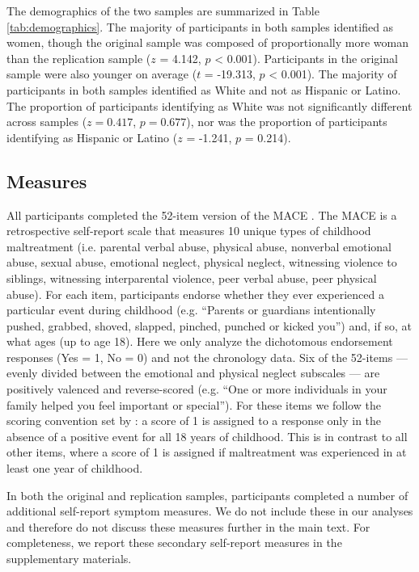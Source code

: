 \documentclass[letterpaper,man,natbib,noextraspace,floatsintext,longtable,12pt]{apa6}
\begin{document}
The demographics of the two samples are summarized in Table \ref{tab:demographics}. The majority of participants in both samples identified as women, though the original sample was composed of proportionally more woman than the replication sample ($z$ = 4.142, $p$ < 0.001). Participants in the original sample were also younger on average ($t$ = -19.313, $p$ < 0.001). The majority of participants in both samples identified as White and not as Hispanic or Latino. The proportion of participants identifying as White was not significantly different across samples ($z = 0.417$, $p = 0.677$), nor was the proportion of participants identifying as Hispanic or Latino ($z$ = -1.241, $p$ = 0.214).

\subsection{Measures}

All participants completed the 52-item version of the MACE \citep{teicher2015maltreatment}. The MACE is a retrospective self-report scale that measures 10 unique types of childhood maltreatment (i.e. parental verbal abuse, physical abuse, nonverbal emotional abuse, sexual abuse, emotional neglect, physical neglect, witnessing violence to siblings, witnessing interparental violence, peer verbal abuse, peer physical abuse). For each item, participants endorse whether they ever experienced a particular event during childhood (e.g. ``Parents or guardians intentionally pushed, grabbed, shoved, slapped, pinched, punched or kicked you'') and, if so, at what ages (up to age 18). Here we only analyze the dichotomous endorsement responses (Yes = 1, No = 0) and not the chronology data. Six of the 52-items --- evenly divided between the emotional and physical neglect subscales --- are positively valenced and reverse-scored (e.g. ``One or more individuals in your family helped you feel important or special''). For these items we follow the scoring convention set by \cite{teicher2015maltreatment}: a score of 1 is assigned to a response only in the absence of a positive event for all 18 years of childhood. This is in contrast to all other items, where a score of 1 is assigned if maltreatment was experienced in at least one year of childhood.

In both the original and replication samples, participants completed a number of additional self-report symptom measures. We do not include these in our analyses and therefore do not discuss these measures further in the main text. For completeness, we report these secondary self-report measures in the supplementary materials. 
\end{document}
